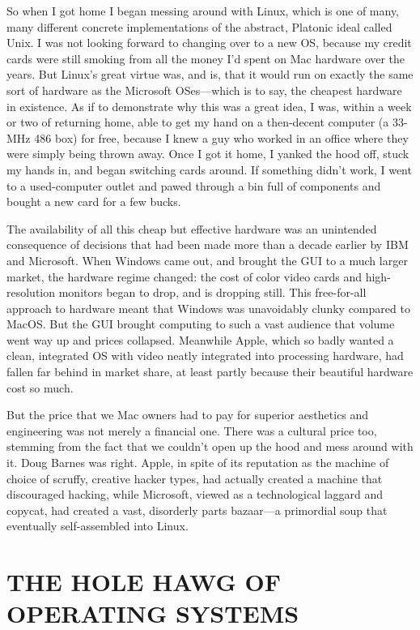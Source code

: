 \documentclass[
  fontsize=11pt,
  paper=landscape,
  twocolumn=true,
  pagesize=pdftex,
  headings=small,
  DIV=15,
  ]{scrartcl}
\begin{document}
So when I got home I began messing around with Linux, which is one of
many, many different concrete implementations of the abstract, Platonic
ideal called Unix. I was not looking forward to changing over to a new
OS, because my credit cards were still smoking from all the money I'd
spent on Mac hardware over the years. But Linux's great virtue was, and
is, that it would run on exactly the same sort of hardware as the
Microsoft OSes---which is to say, the cheapest hardware in existence. As
if to demonstrate why this was a great idea, I was, within a week or two
of returning home, able to get my hand on a then-decent computer (a
33-MHz 486 box) for free, because I knew a guy who worked in an office
where they were simply being thrown away. Once I got it home, I yanked
the hood off, stuck my hands in, and began switching cards around. If
something didn't work, I went to a used-computer outlet and pawed
through a bin full of components and bought a new card for a few bucks.

The availability of all this cheap but effective hardware was an
unintended consequence of decisions that had been made more than a
decade earlier by IBM and Microsoft. When Windows came out, and brought
the GUI to a much larger market, the hardware regime changed: the cost
of color video cards and high-resolution monitors began to drop, and is
dropping still. This free-for-all approach to hardware meant that
Windows was unavoidably clunky compared to MacOS. But the GUI brought
computing to such a vast audience that volume went way up and prices
collapsed. Meanwhile Apple, which so badly wanted a clean, integrated OS
with video neatly integrated into processing hardware, had fallen far
behind in market share, at least partly because their beautiful hardware
cost so much.

But the price that we Mac owners had to pay for superior aesthetics and
engineering was not merely a financial one. There was a cultural price
too, stemming from the fact that we couldn't open up the hood and mess
around with it. Doug Barnes was right. Apple, in spite of its reputation
as the machine of choice of scruffy, creative hacker types, had actually
created a machine that discouraged hacking, while Microsoft, viewed as a
technological laggard and copycat, had created a vast, disorderly parts
bazaar---a primordial soup that eventually self-assembled into Linux.

\section{THE HOLE HAWG OF OPERATING SYSTEMS}
\end{document}
